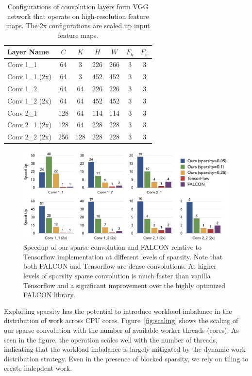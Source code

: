 \documentclass{article}
\begin{document}
\begin{table}[t]\centering
\small
\begin{tabularx}{0.75\textwidth}{Xcccccc}\toprule
    Layer Name & $C$ & $K$ & $H$ & $W$ & $F_h$ & $F_w$\\ \midrule 
    Conv 1\_1 & 64 & 3 & 226 & 266 & 3  & 3 \\
    Conv 1\_1 (2x) & 64 & 3 & 452 & 452 & 3  & 3 \\
    Conv 1\_2  & 64 & 64 & 226 & 226 & 3  & 3 \\
    Conv 1\_2 (2x) & 64 & 64 & 452 & 452 & 3  & 3 \\
    Conv 2\_1  & 128 & 64 & 114 & 114 & 3  & 3 \\
    Conv 2\_1 (2x) & 128 & 64 & 228 & 228 & 3  & 3 \\
    Conv 2\_2 (2x) & 256 & 128 & 228 & 228 & 3  & 3 \\
    \bottomrule
\end{tabularx}
    \vspace{1em}
    \caption{Configurations of convolution layers form VGG network that operate
    on high-resolution feature maps. The 2x configurations are scaled up input
    feature maps.}
\label{tab:conv_config}
\end{table}


\begin{figure}[t]
	\centering
	\includegraphics[width=\textwidth]{falcon_tf}
    \caption{Speedup of our sparse convolution and FALCON relative to
    Tensorflow implementation at different levels of sparsity. Note that both
    FALCON and Tensorflow are dense convolutions. At higher levels of sparsity
    sparse convolution is much faster than vanilla Tensorflow and a significant
    improvement over the highly optimized FALCON library.}
\label{fig:falcon_tf}
\end{figure}

Exploiting sparsity has the potential to introduce workload imbalance in the 
distribution of work across CPU cores. Figure~\ref{fig:scaling} shows the scaling 
of our sparse convolution with the number of available worker threads (cores). 
As seen in the figure, the operation scales well with the number of threads, 
indicating that the workload imbalance is largely mitigated by the dynamic work 
distribution strategy. Even in the presence of blocked sparsity, we rely on tiling
to create indepdent work. 
\end{document}
